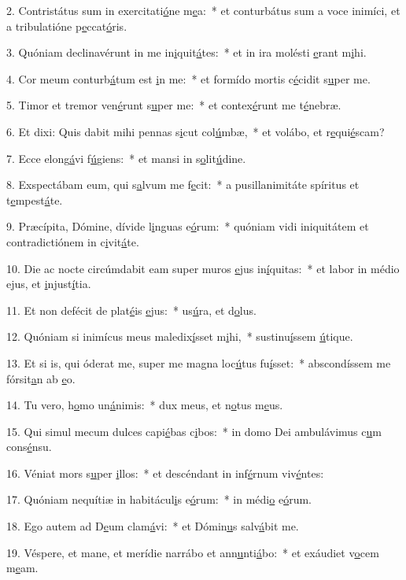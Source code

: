 2. Contristátus sum in exercitati\uline{ó}ne m\uline{e}a:~* et conturbátus sum a voce inimíci, et a tribulatióne p\uline{e}ccat\uline{ó}ris.\par 
3. Quóniam declinavérunt in me in\uline{i}quit\uline{á}tes:~* et in ira molésti \uline{e}rant m\uline{i}hi.\par 
4. Cor meum conturb\uline{á}tum est \uline{i}n me:~* et formído mortis c\uline{é}cidit s\uline{u}per me.\par 
5. Timor et tremor ven\uline{é}runt s\uline{u}per me:~* et contex\uline{é}runt me t\uline{é}nebræ.\par 
6. Et dixi: Quis dabit mihi pennas s\uline{i}cut col\uline{ú}mbæ,~* et volábo, et r\uline{e}qui\uline{é}scam?\par 
7. Ecce elong\uline{á}vi f\uline{ú}giens:~* et mansi in s\uline{o}lit\uline{ú}dine.\par 
8. Exspectábam eum, qui s\uline{a}lvum me f\uline{e}cit:~* a pusillanimitáte spíritus et t\uline{e}mpest\uline{á}te.\par 
9. Præcípita, Dómine, dívide l\uline{i}nguas e\uline{ó}rum:~* quóniam vidi iniquitátem et contradictiónem in c\uline{i}vit\uline{á}te.\par 
10. Die ac nocte circúmdabit eam super muros \uline{e}jus in\uline{í}quitas:~* et labor in médio ejus, et \uline{i}njust\uline{í}tia.\par 
11. Et non defécit de plat\uline{é}is \uline{e}jus:~* us\uline{ú}ra, et d\uline{o}lus.\par 
12. Quóniam si inimícus meus maledix\uline{í}sset m\uline{i}hi,~* sustinu\uline{í}ssem \uline{ú}tique.\par 
13. Et si is, qui óderat me, super me magna loc\uline{ú}tus fu\uline{í}sset:~* abscondíssem me fórsit\uline{a}n ab \uline{e}o.\par 
14. Tu vero, h\uline{o}mo un\uline{á}nimis:~* dux meus, et n\uline{o}tus m\uline{e}us.\par 
15. Qui simul mecum dulces capi\uline{é}bas c\uline{i}bos:~* in domo Dei ambulávimus c\uline{u}m cons\uline{é}nsu.\par 
16. Véniat mors s\uline{u}per \uline{i}llos:~* et descéndant in inf\uline{é}rnum viv\uline{é}ntes:\par 
17. Quóniam nequítiæ in habitácul\uline{i}s e\uline{ó}rum:~* in médi\uline{o} e\uline{ó}rum.\par 
18. Ego autem ad D\uline{e}um clam\uline{á}vi:~* et Dómin\uline{u}s salv\uline{á}bit me.\par 
19. Véspere, et mane, et merídie narrábo et ann\uline{u}nti\uline{á}bo:~* et exáudiet v\uline{o}cem m\uline{e}am.\par 
